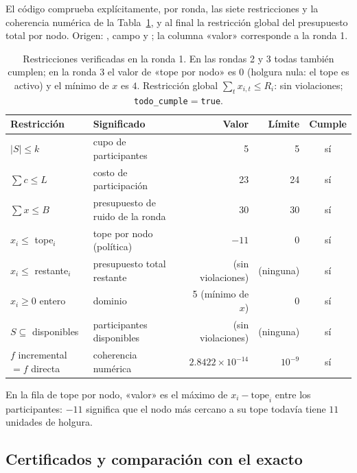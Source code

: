 El código comprueba explícitamente, por ronda, las siete restricciones y la coherencia numérica de la Tabla~\ref{tab:verif}, y al final la restricción global del presupuesto total por nodo. Origen: , campo  y ; la columna «valor» corresponde a la ronda 1.

\begin{table}[h]
\centering
\small
\begin{tabular}{@{}l l r r c@{}}
\toprule
Restricción & Significado & Valor & Límite & Cumple\\
\midrule
$|S|\le k$ & cupo de participantes & 5 & 5 & sí\\
$\sum c\le L$ & costo de participación & 23 & 24 & sí\\
$\sum x\le B$ & presupuesto de ruido de la ronda & 30 & 30 & sí\\
$x_i\le$ tope$_i$ & tope por nodo (política) & $-11$ & 0 & sí\\
$x_i\le$ restante$_i$ & presupuesto total restante & (sin violaciones) & (ninguna) & sí\\
$x_i\ge0$ entero & dominio & 5 (mínimo de $x$) & 0 & sí\\
$S\subseteq$ disponibles & participantes disponibles & (sin violaciones) & (ninguna) & sí\\
$f$ incremental $=f$ directa & coherencia numérica & $2.8422\times10^{-14}$ & $10^{-9}$ & sí\\
\bottomrule
\end{tabular}
\caption{Restricciones verificadas en la ronda 1. En las rondas 2 y 3 todas también cumplen; en la ronda 3 el valor de «tope por nodo» es $0$ (holgura nula: el tope es activo) y el mínimo de $x$ es $4$. Restricción global $\sum_t x_{i,t}\le R_i$: sin violaciones; \texttt{todo\_cumple}$=$\texttt{true}.}\label{tab:verif}
\end{table}

En la fila de tope por nodo, «valor» es el máximo de $x_i-\text{tope}_i$ entre los participantes: $-11$ significa que el nodo más cercano a su tope todavía tiene $11$ unidades de holgura.

\subsection{Certificados y comparación con el exacto}\label{sec:certificados}

